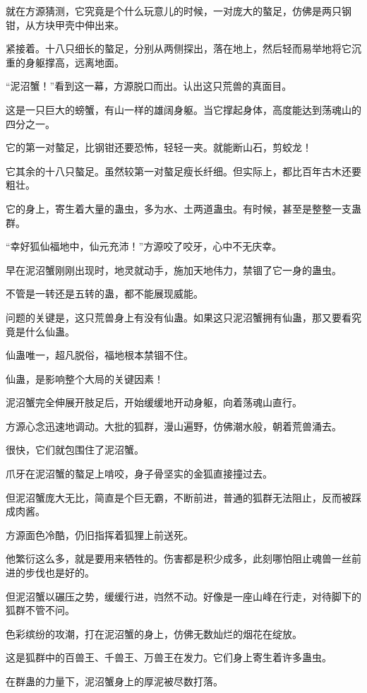 \begin{this_body}
就在方源猜测，它究竟是个什么玩意儿的时候，一对庞大的螯足，仿佛是两只钢钳，从方块甲壳中伸出来。

紧接着。十八只细长的螯足，分别从两侧探出，落在地上，然后轻而易举地将它沉重的身躯撑高，远离地面。

“泥沼蟹！”看到这一幕，方源脱口而出。认出这只荒兽的真面目。

这是一只巨大的螃蟹，有山一样的雄阔身躯。当它撑起身体，高度能达到荡魂山的四分之一。

它的第一对螯足，比钢钳还要恐怖，轻轻一夹。就能断山石，剪蛟龙！

它其余的十八只螯足。虽然较第一对螯足瘦长纤细。但实际上，都比百年古木还要粗壮。

它的身上，寄生着大量的蛊虫，多为水、土两道蛊虫。有时候，甚至是整整一支蛊群。

“幸好狐仙福地中，仙元充沛！”方源咬了咬牙，心中不无庆幸。

早在泥沼蟹刚刚出现时，地灵就动手，施加天地伟力，禁锢了它一身的蛊虫。

不管是一转还是五转的蛊，都不能展现威能。

问题的关键是，这只荒兽身上有没有仙蛊。如果这只泥沼蟹拥有仙蛊，那又要看究竟是什么仙蛊。

仙蛊唯一，超凡脱俗，福地根本禁锢不住。

仙蛊，是影响整个大局的关键因素！

泥沼蟹完全伸展开肢足后，开始缓缓地开动身躯，向着荡魂山直行。

方源心念迅速地调动。大批的狐群，漫山遍野，仿佛潮水般，朝着荒兽涌去。

很快，它们就包围住了泥沼蟹。

爪牙在泥沼蟹的螯足上啃咬，身子骨坚实的金狐直接撞过去。

但泥沼蟹庞大无比，简直是个巨无霸，不断前进，普通的狐群无法阻止，反而被踩成肉酱。

方源面色冷酷，仍旧指挥着狐狸上前送死。

他繁衍这么多，就是要用来牺牲的。伤害都是积少成多，此刻哪怕阻止魂兽一丝前进的步伐也是好的。

但泥沼蟹以碾压之势，缓缓行进，岿然不动。好像是一座山峰在行走，对待脚下的狐群不管不问。

色彩缤纷的攻潮，打在泥沼蟹的身上，仿佛无数灿烂的烟花在绽放。

这是狐群中的百兽王、千兽王、万兽王在发力。它们身上寄生着许多蛊虫。

在群蛊的力量下，泥沼蟹身上的厚泥被尽数打落。


\end{this_body}
